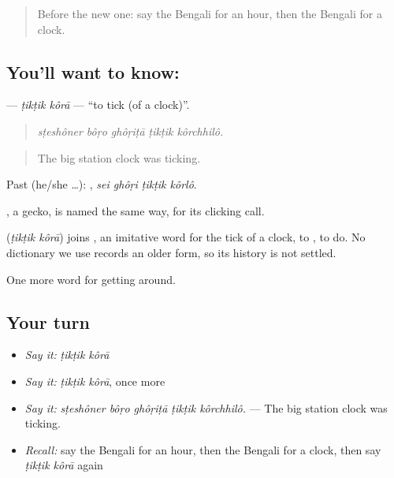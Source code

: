 \label{lesson:BN-C385-tiktik-kora}



\begin{quote}
Before the new one: say the Bengali for an hour, then the Bengali for a clock.
\end{quote}

\subsection*{You'll want to know:  }
\textbf{ } — \emph{ṭikṭik kôrā} — \textquotedblleft{}to tick (of a clock)\textquotedblright{}.

\begin{quote}
    
\end{quote}

\begin{quote}
\emph{sṭeshôner bôṛo ghôṛiṭā ṭikṭik kôrchhilô.}
\end{quote}

\begin{quote}
The big station clock was ticking.
\end{quote}

Past (he/she …):    , \emph{sei ghôṛi ṭikṭik kôrlô}.

, a gecko, is named the same way, for its clicking call.

\begin{cousinweb}
\textbf{ } (\emph{ṭikṭik kôrā}) joins , an imitative word for the tick of a clock, to , to do. No dictionary we use records an older form, so its history is not settled.
\end{cousinweb}

\begin{grammarlens}[title={What you've built}]
One more word for getting around.
\end{grammarlens}

\subsection*{Your turn}
\begin{itemize}
\raggedright
  \item \emph{Say it:} \emph{ṭikṭik kôrā}
  \item \emph{Say it:} \emph{ṭikṭik kôrā}, once more
  \item \emph{Say it:} \emph{sṭeshôner bôṛo ghôṛiṭā ṭikṭik kôrchhilô.} — The big station clock was ticking.
  \item \emph{Recall:} say the Bengali for an hour, then the Bengali for a clock, then say \emph{ṭikṭik kôrā} again
\end{itemize}

